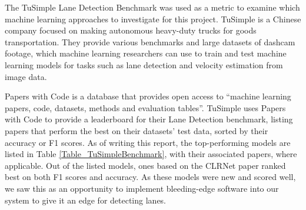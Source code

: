\documentclass[titlepage]{article}
\begin{document}
The TuSimple Lane Detection Benchmark\cite{TuSimpleBenchmark} was used as a metric to examine which machine learning approaches
to investigate for this project.
TuSimple is a Chinese company focused on making autonomous heavy-duty trucks for goods transportation.
They provide various benchmarks and large datasets of dashcam footage, which machine learning researchers can use to train and
test machine learning models for tasks such as lane detection and velocity estimation from image data. \cite{TuSimpleBenchmark}

Papers with Code is a database that provides open access to ``machine learning papers, code, datasets, methods and evaluation
tables''. \cite{PapersWithCode}
TuSimple uses Papers with Code to provide a leaderboard for their Lane Detection benchmark, listing papers that perform the best
on their datasets' test data, sorted by their accuracy or F1 scores.
As of writing this report, the top-performing models are listed in Table \ref{Table_TuSimpleBenchmark}, with their associated
papers, where applicable.
Out of the listed models, ones based on the CLRNet paper ranked best on both F1 scores and accuracy.
As these models were new and scored well, we saw this as an opportunity to implement bleeding-edge software into our system
to give it an edge for detecting lanes.
\end{document}
